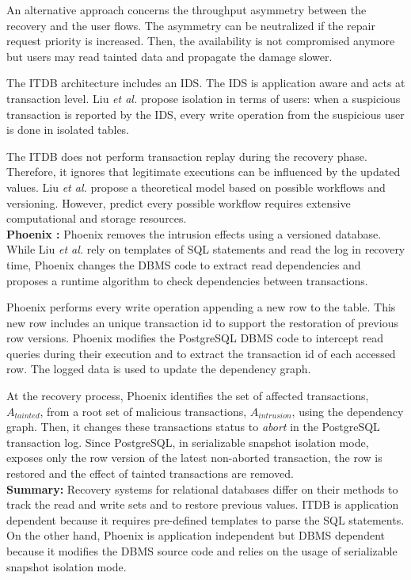 An alternative approach concerns the throughput asymmetry between the recovery and the user flows. The asymmetry can be neutralized if the repair request priority is increased. Then, the availability is not compromised anymore but users may read tainted data and propagate the damage slower. 

The ITDB architecture includes an \acf{IDS}. The \ac{IDS} is application aware and acts at transaction level. Liu \textit{et al.} propose isolation in terms of users: when a suspicious transaction is reported by the \ac{IDS}, every write operation from the suspicious user is done in isolated tables.

The ITDB does not perform transaction replay during the recovery phase. Therefore, it ignores that legitimate executions can be influenced by the updated values. Liu \textit{et al.} propose a theoretical model \cite{Yu2003} based on possible workflows and versioning. However, predict every possible workflow requires extensive computational and storage resources. \\


\textbf{Phoenix \cite{phoenix}:} Phoenix removes the intrusion effects using a versioned database. While Liu \textit{et al.} \cite{Ammann2002} rely on templates of \ac{SQL} statements and read the log in recovery time, Phoenix changes the \ac{DBMS} code to extract read dependencies and proposes a runtime algorithm to check dependencies between transactions.

Phoenix performs every write operation appending a new row to the table. This new row includes an unique transaction id to support the restoration of previous row versions. Phoenix modifies the PostgreSQL \ac{DBMS} code to intercept read queries during their execution and to extract the transaction id of each accessed row. The logged data is used to update the dependency graph.

At the recovery process, Phoenix identifies the set of affected transactions, $A_{tainted}$, from a root set of malicious transactions, $A_{intrusion}$, using the dependency graph. Then, it changes these transactions status to \textit{abort} in the PostgreSQL transaction log. Since PostgreSQL, in serializable snapshot isolation mode, exposes only the row version of the latest non-aborted transaction, the row is restored and the effect of tainted transactions are removed.\\


\textbf{Summary:} Recovery systems for relational databases differ on their methods to track the read and write sets and to restore previous values. ITDB is application dependent because it requires pre-defined templates to parse the \ac{SQL} statements. On the other hand, Phoenix is application independent but \ac{DBMS} dependent because it modifies the \ac{DBMS} source code and relies on the usage of serializable snapshot isolation mode. 

